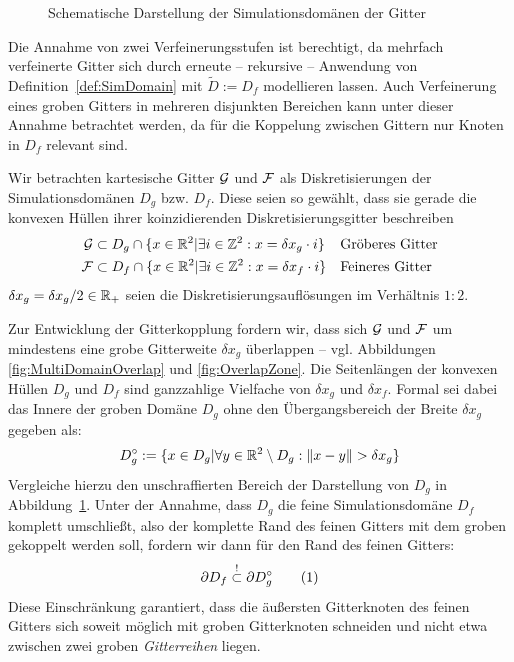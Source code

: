 \begin{figure}[h]
\centering

\caption{Schematische Darstellung der Simulationsdomänen der Gitter}
\label{fig:SimDomain}
\end{figure}

Die Annahme von zwei Verfeinerungsstufen ist berechtigt, da mehrfach verfeinerte Gitter sich durch erneute -- rekursive -- Anwendung von Definition~\ref{def:SimDomain} mit \(\tilde{D} := D_f\) modellieren lassen. Auch Verfeinerung eines groben Gitters in mehreren disjunkten Bereichen kann unter dieser Annahme betrachtet werden, da für die Koppelung zwischen Gittern nur Knoten in \(D_f\) relevant sind.

\begin{Definition}
\label{def:DiskretRefinedGitter}
Wir betrachten kartesische Gitter \(\mathcal{G}\) und \(\mathcal{F}\) als Diskretisierungen der Simulationsdomänen \(D_g\) bzw. \(D_f\). Diese seien so gewählt, dass sie gerade die konvexen Hüllen ihrer koinzidierenden Diskretisierungsgitter beschreiben
\begin{align*}
\mathcal{G} &\subset D_g \cap \{ x \in \mathbb{R}^2 | \exists i \in \mathbb{Z}^2 : x = \delta x_g \cdot i \} && \text{Gröberes Gitter} \\
\mathcal{F} &\subset D_f \cap \{ x \in \mathbb{R}^2 | \exists i \in \mathbb{Z}^2 : x = \delta x_f \cdot i \} && \text{Feineres Gitter}
\end{align*}
\(\delta x_g = \delta x_g / 2 \in \mathbb{R}_+\) seien die Diskretisierungsauflösungen im Verhältnis \(1:2\).
\end{Definition}

Zur Entwicklung der Gitterkopplung fordern wir, dass sich \(\mathcal{G}\) und \(\mathcal{F}\) um mindestens eine grobe Gitterweite \(\delta x_g\) überlappen -- vgl. Abbildungen \ref{fig:MultiDomainOverlap} und \ref{fig:OverlapZone}. Die Seitenlängen der konvexen Hüllen \(D_g\) und \(D_f\) sind ganzzahlige Vielfache von \(\delta x_g\) und \(\delta x_f\). Formal sei dabei das Innere der groben Domäne \(D_g\) ohne den Übergangsbereich der Breite \(\delta x_g\) gegeben als:
\[ D_g^\circ := \{ x \in D_g | \forall y \in \mathbb{R}^2 \setminus D_g : \|x-y\| > \delta x_g \} \]
Vergleiche hierzu den unschraffierten Bereich der Darstellung von \(D_g\) in Abbildung~\ref{fig:SimDomain}.
Unter der Annahme, dass \(D_g\) die feine Simulationsdomäne \(D_f\) komplett umschließt, also der komplette Rand des feinen Gitters mit dem groben gekoppelt werden soll, fordern wir dann für den Rand des feinen Gitters:
\[ \partial D_f \stackrel{!}{\subset} \partial D_g^\circ \numberthis\label{eq:FineBorderIntersectCoarseGrid} \]
Diese Einschränkung garantiert, dass die äußersten Gitterknoten des feinen Gitters sich soweit möglich mit groben Gitterknoten schneiden und nicht etwa zwischen zwei groben \emph{Gitterreihen} liegen.

